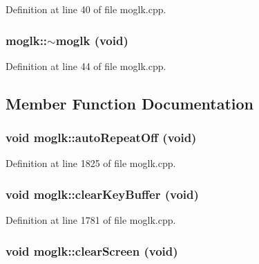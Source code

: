 Definition at line 40 of file moglk.cpp.\hypertarget{classmoglk_19ba0cf0910a364b32685b1806a98773}{
\subsubsection[{$\sim$moglk}]{\setlength{\rightskip}{0pt plus 5cm}moglk::$\sim$moglk (void)}}
\label{classmoglk_19ba0cf0910a364b32685b1806a98773}




Definition at line 44 of file moglk.cpp.

\subsection{Member Function Documentation}
\hypertarget{classmoglk_cbeba932b129751d3980fccf9f462ef0}{
\subsubsection[{autoRepeatOff}]{\setlength{\rightskip}{0pt plus 5cm}void moglk::autoRepeatOff (void)}}
\label{classmoglk_cbeba932b129751d3980fccf9f462ef0}




Definition at line 1825 of file moglk.cpp.\hypertarget{classmoglk_cf2b77285c9281037e194508041c1409}{
\subsubsection[{clearKeyBuffer}]{\setlength{\rightskip}{0pt plus 5cm}void moglk::clearKeyBuffer (void)}}
\label{classmoglk_cf2b77285c9281037e194508041c1409}




Definition at line 1781 of file moglk.cpp.\hypertarget{classmoglk_40044034e8cb0e4caa5c240865ab5b35}{
\subsubsection[{clearScreen}]{\setlength{\rightskip}{0pt plus 5cm}void moglk::clearScreen (void)}}
\label{classmoglk_40044034e8cb0e4caa5c240865ab5b35}




